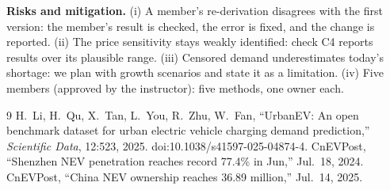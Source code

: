 \documentclass[11pt,a4paper]{article}
\begin{document}
\textbf{Risks and mitigation.} (i) A member's re-derivation disagrees with the first version: the member's result is checked, the error is fixed, and the change is reported. (ii) The price sensitivity stays weakly identified: check C4 reports results over its plausible range. (iii) Censored demand underestimates today's shortage: we plan with growth scenarios and state it as a limitation. (iv) Five members (approved by the instructor): five methods, one owner each.

\begin{thebibliography}{9}\small
{} H.~Li, H.~Qu, X.~Tan, L.~You, R.~Zhu, W.~Fan, ``UrbanEV: An open benchmark dataset for urban electric vehicle charging demand prediction,'' \emph{Scientific Data}, 12:523, 2025. doi:10.1038/s41597-025-04874-4.
 CnEVPost, ``Shenzhen NEV penetration reaches record 77.4\% in Jun,'' Jul.~18, 2024.
 CnEVPost, ``China NEV ownership reaches 36.89 million,'' Jul.~14, 2025.
\end{thebibliography}
\end{document}
